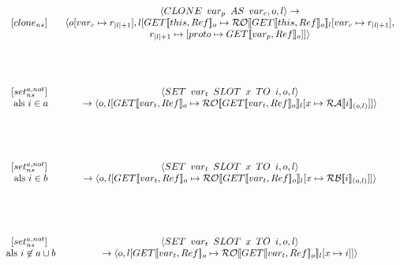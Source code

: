 \documentclass[12pt]{article}
\newcommand{\RA}{\mathcal{RA}}
\newcommand{\RB}{\mathcal{RB}}
\newcommand{\RO}{\mathcal{RO}}
\begin{document}
\[
\begin{matrix}

[clone_{ns}] &
\begin{matrix}
\langle CLONE \enspace var_p \enspace AS \enspace var_c, o, l\rangle 
\rightarrow\\
\langle o[var_c \mapsto r_{|l|+1}], l[GET \llbracket this, Ref \rrbracket_o \mapsto \RO \llbracket GET \llbracket this, Ref \rrbracket_o \rrbracket_l[var_c \mapsto r_{|l|+1}] ,\\ r_{|l|+1} \mapsto [ proto \mapsto GET \llbracket var_p, Ref \rrbracket_o]]\rangle
\end{matrix}\\[60pt]
\begin{matrix}
[set_{ns}^{a,not}]\\
\mbox{ als } i \in a\\
\end{matrix} &
\begin{matrix}
\langle SET \enspace var_t \enspace SLOT \enspace x \enspace TO \enspace i, o, l \rangle\\
\rightarrow
\langle o, l[GET \llbracket var_t, Ref \rrbracket_o \mapsto \RO \llbracket GET \llbracket var_t, Ref \rrbracket_o \rrbracket_l[x \mapsto \RA 
\llbracket i \rrbracket_{(o,l)}]] \rangle
\end{matrix}\\[60pt]
\begin{matrix}
[set_{ns}^{a,not}]\\
\mbox{ als } i \in b\\
\end{matrix} &
\begin{matrix}
\langle SET \enspace var_t \enspace SLOT \enspace x \enspace TO \enspace i, o, l \rangle\\
\rightarrow
\langle o, l[GET \llbracket var_t, Ref \rrbracket_o \mapsto \RO \llbracket GET \llbracket var_t, Ref \rrbracket_o \rrbracket_l[x \mapsto \RB 
\llbracket i \rrbracket_{(o,l)}]] \rangle
\end{matrix}\\[60pt]
\begin{matrix}
[set_{ns}^{a,not}]\\
\mbox{ als } i \not\in a \cup b\\
\end{matrix} &
\begin{matrix}
\langle SET \enspace var_t \enspace SLOT \enspace x \enspace TO \enspace i, o, l \rangle\\
\rightarrow
\langle o, l[GET \llbracket var_t, Ref \rrbracket_o \mapsto \RO \llbracket GET \llbracket var_t, Ref \rrbracket_o \rrbracket_l[x \mapsto i ]] \rangle
\end{matrix}\\
\end{matrix}\\
\]
\end{document}
